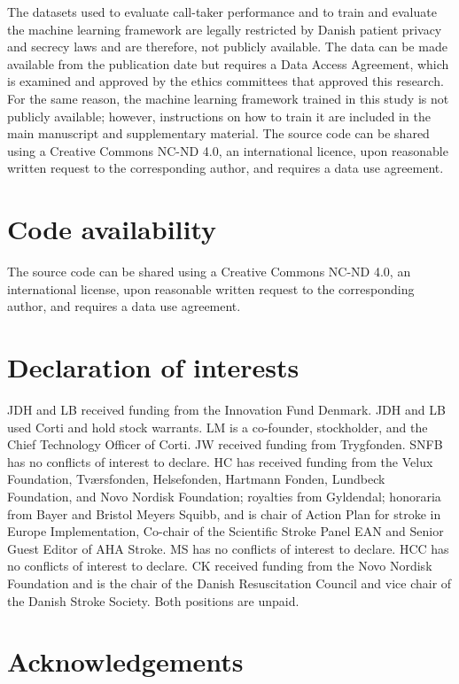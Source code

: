 {The datasets used to evaluate call-taker performance and to train and evaluate the machine learning framework are legally restricted by Danish patient privacy and secrecy laws and are therefore, not publicly available. The data can be made available from the publication date but requires a Data Access Agreement, which is examined and approved by the ethics committees that approved this research. For the same reason, the machine learning framework trained in this study is not publicly available; however, instructions on how to train it are included in the main manuscript and supplementary material. The source code can be shared using a Creative Commons NC-ND 4.0, an international licence, upon reasonable written request to the corresponding author, and requires a data use agreement.


\section{Code availability}

The source code can be shared using a Creative Commons NC-ND 4.0, an international license, upon reasonable written request to the corresponding author, and requires a data use agreement.


\section{Declaration of interests}

JDH and LB received funding from the Innovation Fund Denmark. JDH and LB used Corti and hold stock warrants. LM is a co-founder, stockholder, and the Chief Technology Officer of Corti. JW received funding from Trygfonden. SNFB has no conflicts of interest to declare. HC has received funding from the Velux Foundation, Tværsfonden, Helsefonden, Hartmann Fonden, Lundbeck Foundation, and Novo Nordisk Foundation; royalties from Gyldendal; honoraria from Bayer and Bristol Meyers Squibb, and is chair of Action Plan for stroke in Europe Implementation, Co-chair of the Scientific Stroke Panel EAN and Senior Guest Editor of AHA Stroke. MS has no conflicts of interest to declare. HCC has no conflicts of interest to declare. CK received funding from the Novo Nordisk Foundation and is the chair of the Danish Resuscitation Council and vice chair of the Danish Stroke Society. Both positions are unpaid.


\section*{Acknowledgements}

}
